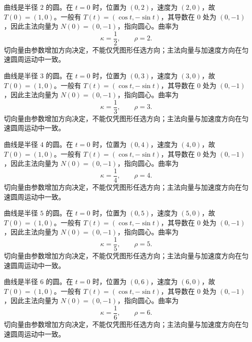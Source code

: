\documentclass[12pt,fontset=fandol]{ctexart}
\begin{document}
\begin{solve}\label{ans:c31q20}
曲线是半径 $2$ 的圆。在 $t=0$ 时，位置为 $(0,2)$，速度为 $(2,0)$，故 $T(0)=(1,0)$。一般有 $T(t)=(\cos t,-\sin t)$，其导数在 $0$ 处为 $(0,-1)$，因此主法向量为 $N(0)=(0,-1)$，指向圆心。曲率为
\[
\kappa=\frac1{2},\qquad\rho=2.
\]
切向量由参数增加方向决定，不能仅凭图形任选方向；主法向量与加速度方向在匀速圆周运动中一致。
\end{solve}

\begin{solve}\label{ans:c31q21}
曲线是半径 $3$ 的圆。在 $t=0$ 时，位置为 $(0,3)$，速度为 $(3,0)$，故 $T(0)=(1,0)$。一般有 $T(t)=(\cos t,-\sin t)$，其导数在 $0$ 处为 $(0,-1)$，因此主法向量为 $N(0)=(0,-1)$，指向圆心。曲率为
\[
\kappa=\frac1{3},\qquad\rho=3.
\]
切向量由参数增加方向决定，不能仅凭图形任选方向；主法向量与加速度方向在匀速圆周运动中一致。
\end{solve}

\begin{solve}\label{ans:c31q22}
曲线是半径 $4$ 的圆。在 $t=0$ 时，位置为 $(0,4)$，速度为 $(4,0)$，故 $T(0)=(1,0)$。一般有 $T(t)=(\cos t,-\sin t)$，其导数在 $0$ 处为 $(0,-1)$，因此主法向量为 $N(0)=(0,-1)$，指向圆心。曲率为
\[
\kappa=\frac1{4},\qquad\rho=4.
\]
切向量由参数增加方向决定，不能仅凭图形任选方向；主法向量与加速度方向在匀速圆周运动中一致。
\end{solve}

\begin{solve}\label{ans:c31q23}
曲线是半径 $5$ 的圆。在 $t=0$ 时，位置为 $(0,5)$，速度为 $(5,0)$，故 $T(0)=(1,0)$。一般有 $T(t)=(\cos t,-\sin t)$，其导数在 $0$ 处为 $(0,-1)$，因此主法向量为 $N(0)=(0,-1)$，指向圆心。曲率为
\[
\kappa=\frac1{5},\qquad\rho=5.
\]
切向量由参数增加方向决定，不能仅凭图形任选方向；主法向量与加速度方向在匀速圆周运动中一致。
\end{solve}

\begin{solve}\label{ans:c31q24}
曲线是半径 $6$ 的圆。在 $t=0$ 时，位置为 $(0,6)$，速度为 $(6,0)$，故 $T(0)=(1,0)$。一般有 $T(t)=(\cos t,-\sin t)$，其导数在 $0$ 处为 $(0,-1)$，因此主法向量为 $N(0)=(0,-1)$，指向圆心。曲率为
\[
\kappa=\frac1{6},\qquad\rho=6.
\]
切向量由参数增加方向决定，不能仅凭图形任选方向；主法向量与加速度方向在匀速圆周运动中一致。
\end{solve}
\end{document}
